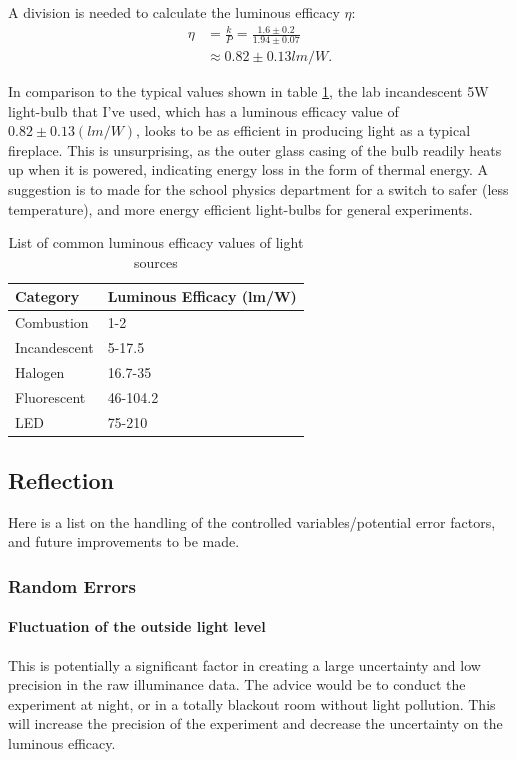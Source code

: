 \documentclass[a4paper,12pt]{article}
\begin{document}
A division is needed to calculate the luminous efficacy $\eta$:
\begin{align*}
    \eta &= \frac{k}{P} = \frac{1.6 \pm 0.2}{1.94 \pm 0.07}\\
    &\approx 0.82 \pm 0.13 \si{lm\per W}.
\end{align*}

In comparison to the typical values shown in table \ref{tbl:leff}, the lab incandescent 5W light-bulb that I've used, which has a luminous efficacy value of $0.82 \pm 0.13 (\si{lm\per W})$, looks to be as efficient in producing light as a typical fireplace. This is unsurprising, as the outer glass casing of the bulb readily heats up when it is powered, indicating energy loss in the form of thermal energy. A suggestion is to made for the school physics department for a switch to safer (less temperature), and more energy efficient light-bulbs for general experiments.

\begin{table}[H]
    \centering
    \begin{tabular}{l|l}
        Category     & Luminous Efficacy (lm/W) \\ \hline
        Combustion   & 1-2                      \\
        Incandescent & 5-17.5                   \\
        Halogen      & 16.7-35                  \\
        Fluorescent  & 46-104.2                 \\
        LED          & 75-210
    \end{tabular}
    \caption{List of common luminous efficacy values of light sources}
    \label{tbl:leff}
\end{table}


\subsection{Reflection}

Here is a list on the handling of the controlled variables/potential error factors, and future improvements to be made.

\subsubsection{Random Errors}
\paragraph{Fluctuation of the outside light level} This is potentially a significant factor in creating a large uncertainty and low precision in the raw illuminance data. The advice would be to conduct the experiment at night, or in a totally blackout room without light pollution. This will increase the precision of the experiment and decrease the uncertainty on the luminous efficacy.
\end{document}
